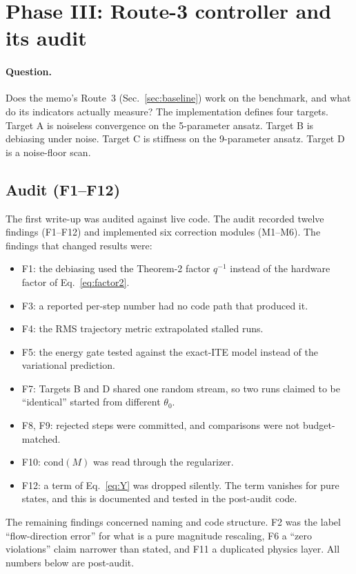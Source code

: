 \documentclass[aps,pra,reprint,superscriptaddress,nofootinbib]{revtex4-2}
\newcommand{\cond}{\mathrm{cond}}
\begin{document}
\section{Phase III: Route-3 controller and its audit}
\label{sec:phase3}

\paragraph*{Question.} Does the memo's Route~3 (Sec.~\ref{sec:baseline}) work on the benchmark,
and what do its indicators actually measure? The implementation defines four targets. Target A
is noiseless convergence on the 5-parameter ansatz. Target B is debiasing under noise. Target
C is stiffness on the 9-parameter ansatz. Target D is a noise-floor scan.

\subsection{Audit (F1--F12)}

The first write-up was audited against live code. The audit
recorded twelve findings (F1--F12) and implemented six correction modules (M1--M6). The
findings that changed results were:
\begin{itemize}
\setlength\itemsep{0pt}
\item F1: the debiasing used the Theorem-2 factor $q^{-1}$ instead of the hardware factor of
  Eq.~\eqref{eq:factor2}.
\item F3: a reported per-step number had no code path that produced it.
\item F4: the RMS trajectory metric extrapolated stalled runs.
\item F5: the energy gate tested against the exact-ITE model instead of the variational
  prediction.
\item F7: Targets B and D shared one random stream, so two runs claimed to be ``identical''
  started from different $\theta_0$.
\item F8, F9: rejected steps were committed, and comparisons were not budget-matched.
\item F10: $\cond(M)$ was read through the regularizer.
\item F12: a term of Eq.~\eqref{eq:Y} was dropped silently. The term vanishes for pure states,
  and this is documented and tested in the post-audit code.
\end{itemize}
The remaining findings concerned naming and code structure. F2 was the label ``flow-direction
error'' for what is a pure magnitude rescaling, F6 a ``zero violations'' claim narrower than
stated, and F11 a duplicated physics layer. All numbers below are post-audit.
\end{document}
